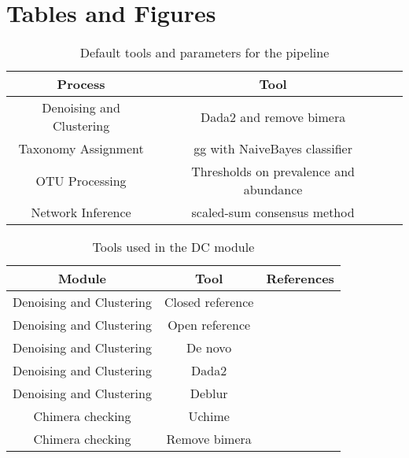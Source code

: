 
\newpage
\section*{Tables and Figures}


  \begin{table}[h]
    \centering
    \small
    \begin{tabular}{|c|c|c|}
      \hline
      \textbf{Process} & \textbf{Tool} \\
      \hline
      Denoising and Clustering & Dada2 and remove bimera \\
      Taxonomy Assignment & \ac{gg} with NaiveBayes classifier \\
      OTU Processing & Thresholds on prevalence and abundance \\
      Network Inference & scaled-sum consensus method \\
      \hline
    \end{tabular}
    \caption{Default tools and parameters for the pipeline}
    \label{tab:default_options}
  \end{table}

  \begin{table}[h]
    \centering
    \small
    \begin{tabular}{|c|c|c|}
      \hline
      \textbf{Module} & \textbf{Tool} & \textbf{References} \\
      \hline
      Denoising and Clustering & Closed reference & \cite{rognesVSEARCHVersatileOpen2016,bolyenReproducibleInteractiveScalable2019} \\
      Denoising and Clustering & Open reference & \cite{rognesVSEARCHVersatileOpen2016,bolyenReproducibleInteractiveScalable2019} \\
      Denoising and Clustering & De novo & \cite{rognesVSEARCHVersatileOpen2016,bolyenReproducibleInteractiveScalable2019} \\
      Denoising and Clustering & Dada2 & \cite{Callahan2016} \\
      Denoising and Clustering & Deblur & \cite{Amir2017,bolyenReproducibleInteractiveScalable2019} \\
      \hline
      Chimera checking & Uchime & \cite{rognesVSEARCHVersatileOpen2016,bolyenReproducibleInteractiveScalable2019} \\
      Chimera checking & Remove bimera & \cite{Callahan2016} \\
      \hline
    \end{tabular}
    \caption{Tools used in the DC module}
    \label{tab:dc_tools}
  \end{table}

